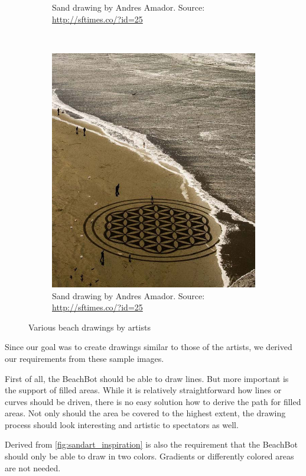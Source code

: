 \begin{figure}
\begin{subfigure}[b]{0.46\textwidth}
\caption{Sand drawing by Andres Amador. Source: \url{http://sftimes.co/?id=25}}
\end{subfigure}
~
\begin{subfigure}[b]{0.46\textwidth}
\includegraphics[width=\textwidth]{images/requirements_inspiration/andres_armador_2.jpg} 
\caption{Sand drawing by Andres Amador. Source: \url{http://sftimes.co/?id=25}}
\end{subfigure}
\caption{Various beach drawings by artists}
\label{fig:sandart_inspiration}
\end{figure}

Since our goal was to create drawings similar to those of the artists, we derived our requirements from these sample images.

First of all, the BeachBot should be able to draw lines. But more important is the support of filled areas. While it is relatively straightforward how lines or curves should be driven, there is no easy solution how to derive the path for filled areas. Not only should the area be covered to the highest extent, the drawing process should look interesting and artistic to spectators as well.

Derived from \autoref{fig:sandart_inspiration} is also the requirement that the BeachBot should only be able to draw in two colors. Gradients or differently colored areas are not needed.


